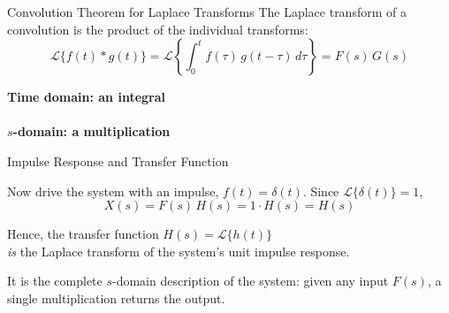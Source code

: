 \documentclass[12pt, aspectratio=169]{beamer}
\begin{document}
\begin{frame}{Convolution Theorem for Laplace Transforms}
    The Laplace transform of a convolution is the \alert{product} of the individual
    transforms:
    \[
        \mathcal{L}\{f(t) * g(t)\}
        = \mathcal{L}\left\{\int_{0}^{t}\! f(\tau)\,g(t-\tau)\,d\tau\right\}
        = F(s)\,G(s)
    \]
    \vspace{-0.4em}
    \begin{center}
        {\small \textbf{Time domain: an integral}}\\[2pt]
        \\[6pt]
        {\small \textbf{$s$-domain: a multiplication}}\\[2pt]
    \end{center}
\end{frame}


\begin{frame}{Impulse Response and Transfer Function}
    \begin{center}
    \end{center}
    \vspace{0.4em}
    Now drive the system with an impulse, $f(t) = \delta(t)$. Since
    $\mathcal{L}\{\delta(t)\} = 1$,
    \[
        X(s) = F(s)\,H(s) = 1 \cdot H(s) = H(s)
    \]
    \begin{center}
        Hence, the \alert{transfer function} $H(s) = \mathcal{L}\{h(t)\}$ \\
        \alert{\emph{is} the Laplace transform of the system's unit impulse response.}
    \end{center}
    \vspace{0.3em}
    \small It is the complete $s$-domain description of the system: given any input
    $F(s)$, a single multiplication returns the output.
\end{frame}
\end{document}
